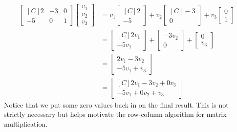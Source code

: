 \begin{example}
\begin{align*}
\begin{bmatrix*}[C]
2 & -3 & 0 \\
-5 & 0 & 1 
\end{bmatrix*}
\begin{bmatrix}v_1\\ v_2 \\ v_3 \end{bmatrix}
&=v_1\begin{bmatrix*}[C]2\\-5 \end{bmatrix*}
+v_2\begin{bmatrix*}[C]-3 \\0\end{bmatrix*}
+v_3\begin{bmatrix}0\\1\end{bmatrix}\\
&=\begin{bmatrix*}[C]2v_1\\-5v_1\end{bmatrix*}
+\begin{bmatrix}-3v_2\\ 0\end{bmatrix} 
+\begin{bmatrix}0\\v_3\end{bmatrix}\\
&=\begin{bmatrix}2v_1-3v_2\\-5v_1+v_3\end{bmatrix}\\
&=\begin{bmatrix*}[C]2v_1-3v_2+0v_3\\-5v_1+0v_2+v_3\end{bmatrix*}
\end{align*}
Notice that we put some zero values back in on the final result. This is not 
strictly necessary but helps motivate the row-column algorithm for matrix 
multiplication.
\end{example}

